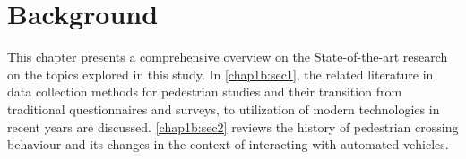 \chapter{Background}
\label{chap1b}
This chapter presents a comprehensive overview on the State-of-the-art research on the topics explored in this study. In \cref{chap1b:sec1}, the related literature in data collection methods for pedestrian studies and their transition from traditional questionnaires and surveys, to utilization of modern technologies in recent years are discussed. \cref{chap1b:sec2} reviews the history of pedestrian crossing behaviour and its changes in the context of interacting with automated vehicles. 

